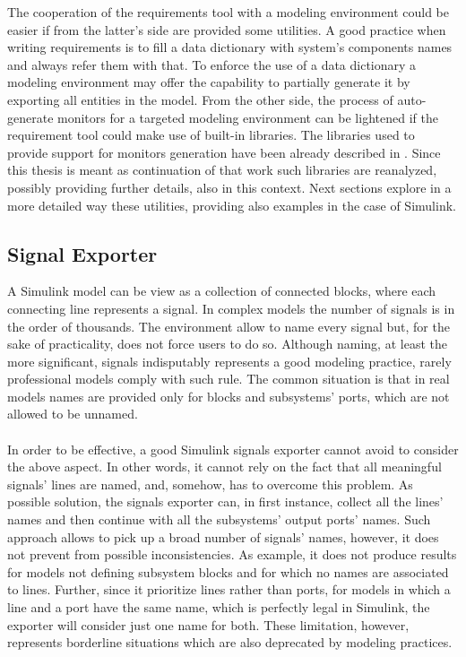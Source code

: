 The cooperation of the requirements tool with a modeling environment could be easier if from the latter's side are provided some utilities. A good practice when writing requirements is to fill a data dictionary with system's components names and always refer them with that. To enforce the use of a data dictionary a modeling environment may offer the capability to partially generate it by exporting all entities in the model. From the other side, the process of auto-generate monitors for a targeted modeling environment can be lightened if the requirement tool could make use of built-in libraries. The libraries used to provide support for monitors generation have been already described in \citep{bals2017}. Since this thesis is meant as continuation of that work such libraries are reanalyzed, possibly providing further details, also in this context. Next sections explore in a more detailed way these utilities, providing also examples in the case of Simulink.

\subsection{Signal Exporter}

A Simulink model can be view as a collection of connected blocks, where each connecting line represents a signal. In complex models the number of signals is in the order of thousands. The environment allow to name every signal but, for the sake of practicality, does not force users to do so. Although naming, at least the more significant, signals indisputably represents a good modeling practice, rarely professional models comply with such rule. The common situation is that in real models names are provided only for blocks and subsystems' ports, which are not allowed to be unnamed.
\paragraph{} In order to be effective, a good Simulink signals exporter cannot avoid to consider the above aspect. In other words, it cannot rely on the fact that all meaningful signals' lines are named, and, somehow, has to overcome this problem. As possible solution, the signals exporter can, in first instance, collect all the lines' names and then continue with all the subsystems' output ports' names. Such approach allows to pick up a broad number of signals' names, however, it does not prevent from possible inconsistencies. As example, it does not produce results for models not defining subsystem blocks and for which no names are associated to lines. Further, since it prioritize lines rather than ports, for models in which a line and a port have the same name, which is perfectly legal in Simulink, the exporter will consider just one name for both. These limitation, however, represents borderline situations which are also deprecated by modeling practices.

